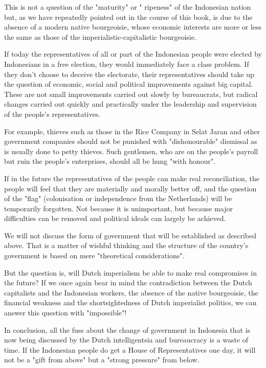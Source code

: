 This is not a question of the "maturity" or " ripeness" of the Indonesian nation but, as we have repeatedly pointed 
out in the course of this book, is due to the absence of a modern native bourgeoisie, whose economic interests are 
more or less the same as those of the imperialistic-capitalistic bourgeoisie.\nline

If today the representatives of all or part of the Indonesian people were elected by Indonesians in a free election, 
they would immediately face a class problem. If they don't choose to deceive the electorate, their representatives 
should take up the question of economic, social and political improvements against big capital. These are not small 
improvements carried out slowly by bureaucrats, but radical changes carried out quickly and practically under the 
leadership and supervision of the people's representatives.\nline

For example, thieves such as those in the Rice Company in Selat Jaran and other government companies should not 
be punished with "dishonourable" dismissal as is usually done to petty thieves. Such gentlemen, who are on the 
people's payroll but ruin the people's enterprises, should all be hung "with honour".\nline

If in the future the representatives of the people can make real reconciliation, the people will feel that 
they are materially and morally better off, and the question of the "flag" (colonisation or independence from the Netherlands) 
will be temporarily forgotten. Not because it is unimportant, but because major difficulties can be removed and political 
ideals can largely be achieved.\nline

We will not discuss the form of government that will be established as described above. That is a 
matter of wishful thinking and the structure of the country's government is based on mere "theoretical considerations".\nline

But the question is, will Dutch imperialism be able to make real compromises in the future? If we once again bear in 
mind the contradiction between the Dutch capitalists and the Indonesian workers, the absence of the native bourgeoisie, 
the financial weakness and the shortsightedness of Dutch imperialist politics, we can answer this question with "impossible"!\nline

In conclusion, all the fuss about the change of government in Indonesia that is now being discussed by the Dutch intelligentsia and 
bureaucracy is a waste of time. If the Indonesian people do get a House of Representatives one day, it will not be a "gift from above" 
but a "strong pressure" from below.\nline